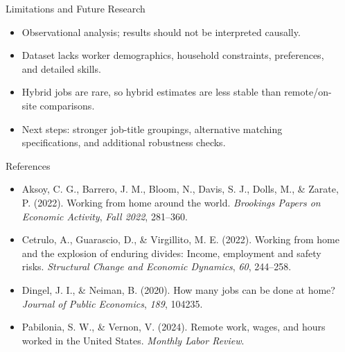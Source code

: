 \documentclass[final]{beamer}
\newlength{\sepwidth}
\newlength{\colwidth}
\newcommand{\separatorcolumn}{\begin{column}{\sepwidth}\end{column}}
\begin{document}
\begin{frame}[t]
\begin{columns}[t]
\begin{column}{\colwidth}
  \begin{block}{Limitations and Future Research}
    \begin{itemize}
      \item Observational analysis; results should not be interpreted causally.
      \item Dataset lacks worker demographics, household constraints, preferences, and detailed skills.
      \item Hybrid jobs are rare, so hybrid estimates are less stable than remote/on-site comparisons.
      \item Next steps: stronger job-title groupings, alternative matching specifications, and additional robustness checks.
    \end{itemize}
  \end{block}

  \begin{block}{References}
    \scriptsize
    \begin{itemize}
      \item Aksoy, C. G., Barrero, J. M., Bloom, N., Davis, S. J., Dolls, M., \& Zarate, P. (2022). Working from home around the world. \textit{Brookings Papers on Economic Activity}, \textit{Fall 2022}, 281--360.
      \item Cetrulo, A., Guarascio, D., \& Virgillito, M. E. (2022). Working from home and the explosion of enduring divides: Income, employment and safety risks. \textit{Structural Change and Economic Dynamics}, \textit{60}, 244--258.
      \item Dingel, J. I., \& Neiman, B. (2020). How many jobs can be done at home? \textit{Journal of Public Economics}, \textit{189}, 104235.
      \item Pabilonia, S. W., \& Vernon, V. (2024). Remote work, wages, and hours worked in the United States. \textit{Monthly Labor Review}.
    \end{itemize}
  \end{block}

\end{column}
\separatorcolumn
\end{columns}
\end{frame}
\end{document}
